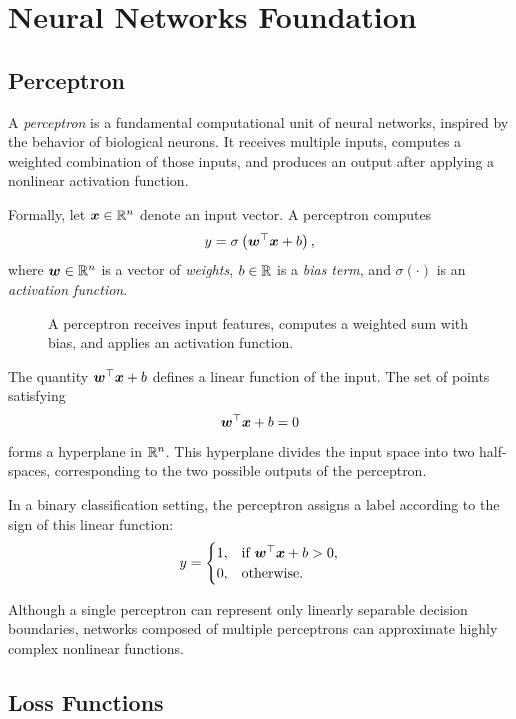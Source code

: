 \chapter{Neural Networks Foundation}

\section{Perceptron}

A \emph{perceptron} is a fundamental computational unit of neural networks, inspired by the behavior of biological neurons. It receives multiple inputs, computes a weighted combination of those inputs, and produces an output after applying a nonlinear activation function.

Formally, let $\bm{x} \in \mathbb{R}^n$ denote an input vector. A perceptron computes
\[
    y = \sigma\left(\bm{w}^\top \bm{x} + b\right),
\]
where $\bm{w} \in \mathbb{R}^n$ is a vector of \emph{weights}, $b \in \mathbb{R}$ is a \emph{bias term}, and $\sigma(\cdot)$ is an \emph{activation function}.

\begin{figure}[tb]
    \centering
    
    \caption{A perceptron receives input features, computes a weighted sum with bias, and applies an activation function.}
\end{figure}

The quantity $\bm{w}^\top \bm{x} + b$ defines a linear function of the input. The set of points satisfying
\[
    \bm{w}^\top \bm{x} + b = 0
\]
forms a hyperplane in $\mathbb{R}^n$. This hyperplane divides the input space into two half-spaces, corresponding to the two possible outputs of the perceptron.

In a binary classification setting, the perceptron assigns a label according to the sign of this linear function:
\[
    y =
    \begin{cases}
        1, & \text{if } \bm{w}^\top \bm{x} + b > 0, \\
        0, & \text{otherwise.}
    \end{cases}
\]

Although a single perceptron can represent only linearly separable decision boundaries, networks composed of multiple perceptrons can approximate highly complex nonlinear functions.


\section{Loss Functions}


